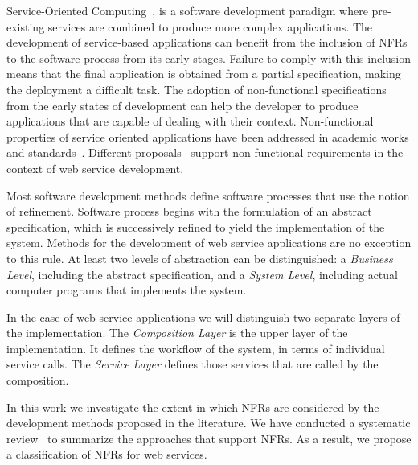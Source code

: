 \documentclass{sig-alternate}
\begin{document}
Service-Oriented Computing~\cite{Papazoglou2007}, is a software development paradigm where pre-existing services are combined to produce more complex applications. 
The development of service-based applications can benefit from the inclusion of NFRs to the software process from its early stages.
Failure to comply with this inclusion means that the final application is obtained from a partial specification, making the deployment a difficult task.
The adoption of non-functional specifications from the early states of development
can help the developer to produce applications that are capable of dealing with
their context.
Non-functional properties of service oriented applications have been
addressed in academic works and standards~\cite{ws-co,ws-tra,wsci}.
Different proposals~\cite{Babamir2010,AgarwalLS09,CholletL09,GutierrezRF10,XiaoCZBOLH08,JeongCL09,TsadimasNA12}
support non-functional requirements in the context of web service development. 

Most software development methods define software processes that use the notion of refinement.
Software process begins with the formulation of an abstract specification, which is successively refined to yield the implementation of the system.
Methods for the development of web service applications are no exception to this rule.
At least two levels of abstraction can be distinguished: a \textit{Business Level}, including the abstract specification, and a \textit{System Level}, including actual computer programs that implements the system.

In the case of web service applications we will distinguish two separate layers of the implementation.
The \textit{Composition Layer} is the upper layer of the implementation. 
It defines the workflow of the system, in terms of individual service calls.
The \textit{Service Layer} defines those services that are called by the composition.

\bigskip
 
In this work we investigate the extent in which NFRs are considered by the development methods proposed in the literature.
We have conducted a systematic review~\cite{Kitchenham08} to summarize the approaches that support NFRs.
As a result, we propose a classification of NFRs for web services.
\end{document}
